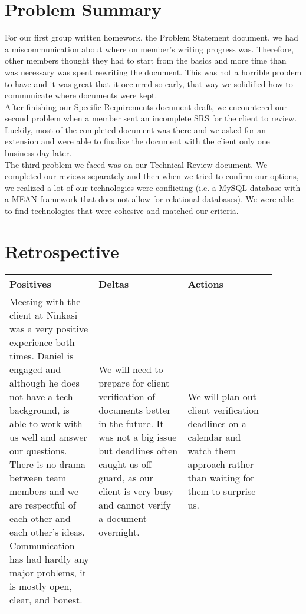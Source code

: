 \documentclass[draftclsnofoot,onecolumn,letterpaper,10pt,compsoc]{IEEEtran}
\begin{document}
\section{Problem Summary}
For our first group written homework, the Problem Statement document, we had a miscommunication about where on member’s writing progress was.
Therefore, other members thought they had to start from the basics and more time than was necessary was spent rewriting the document.
This was not a horrible problem to have and it was great that it occurred so early, that way we solidified how to communicate where documents were kept. \\
After finishing our Specific Requirements document draft, we encountered our second problem when a member sent an incomplete SRS for the client to review.
Luckily, most of the completed document was there and we asked for an extension and were able to finalize the document with the client only one business day later.\\
The third problem we faced was on our Technical Review document.
We completed our reviews separately and then when we tried to confirm our options, we realized a lot of our technologies were conflicting (i.e. a MySQL database with a MEAN framework that does not allow for relational databases).
We were able to find technologies that were cohesive and matched our criteria.

\section{Retrospective}
\begin{center}
    \begin{tabular}{|p{0.3\linewidth}|p{0.3\linewidth}|p{0.3\linewidth}|}
        \hline
             Positives & Deltas & Actions \\
        \hline
            Meeting with the client at Ninkasi was a very positive experience both times.
						Daniel is engaged and although he does not have a tech background, is able to work with us well and answer our questions.
						There is no drama between team members and we are respectful of each other and each other’s ideas.
						Communication has had hardly any major problems, it is mostly open, clear, and honest.
            &
            We will need to prepare for client verification of documents better in the future.
						It was not a big issue but deadlines often caught us off guard, as our client is very busy and cannot verify a document overnight.
            &
            We will plan out client verification deadlines on a calendar and watch them approach rather than waiting for them to surprise us.
            \\
            \hline
    \end{tabular}
\end{center}
\end{document}
